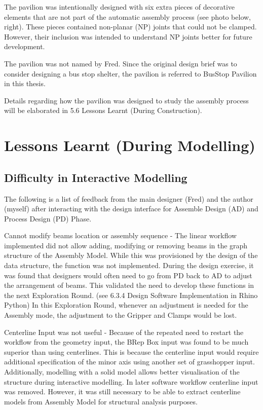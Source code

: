 The pavilion was intentionally designed with six extra pieces of decorative elements that are not part of the automatic assembly process (see photo below, right). These pieces contained non-planar (NP) joints that could not be clamped. However, their inclusion was intended to understand NP joints better for future development.
 
The pavilion was not named by Fred. Since the original design brief was to consider designing a bus stop shelter, the pavilion is referred to BusStop Pavilion in this thesis.

Details regarding how the pavilion was designed to study the assembly process will be elaborated in 5.6 Lessons Learnt (During Construction).

\section{Lessons Learnt (During Modelling)}
\label{section:exploration_2_lessons_learnt_during_modelling}

\subsection{Difficulty in Interactive Modelling}
\label{subsection:exploration_2_difficulty_in_interactive_modelling}

The following is a list of feedback from the main designer (Fred) and the author (myself) after interacting with the design interface for Assemble Design (AD) and Process Design (PD) Phase.

Cannot modify beams location or assembly sequence - The linear workflow implemented did not allow adding, modifying or removing beams in the graph structure of the Assembly Model. While this was provisioned by the design of the data structure, the function was not implemented. During the design exercise, it was found that designers would often need to go from PD back to AD to adjust the arrangement of beams. This validated the need to develop these functions in the next Exploration Round. (see 6.3.4 Design Software Implementation in Rhino Python) In this Exploration Round, whenever an adjustment is needed for the Assembly mode, the adjustment to the Gripper and Clamps would be lost.

Centerline Input was not useful - Because of the repeated need to restart the workflow from the geometry input, the BRep Box input was found to be much superior than using centerlines. This is because the centerline input would require additional specification of the minor axis using another set of grasshopper input. Additionally, modelling with a solid model allows better visualisation of the structure during interactive modelling. In later software workflow centerline input was removed. However, it was still necessary to be able to extract centerline models from Assembly Model for structural analysis purposes.

